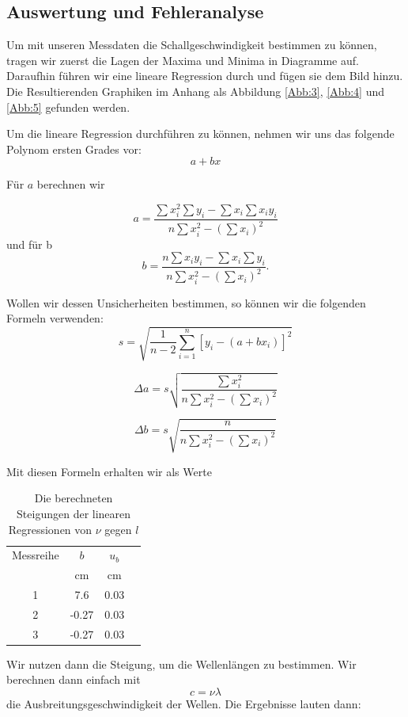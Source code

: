 \documentclass[11pt,a4paper]{article}
\begin{document}
\subsection{Auswertung und Fehleranalyse}

Um mit unseren Messdaten die Schallgeschwindigkeit bestimmen zu k\"onnen, tragen wir zuerst die Lagen der Maxima und Minima in Diagramme auf. Daraufhin f\"uhren wir eine lineare Regression durch und f\"ugen sie dem Bild hinzu. Die Resultierenden Graphiken im Anhang als Abbildung \ref{Abb:3}, \ref{Abb:4} und \ref{Abb:5} gefunden werden.

Um die lineare Regression durchf\"uhren zu k\"onnen, nehmen wir uns das folgende Polynom ersten Grades vor:
\[ a+bx\]

F\"ur $a$ berechnen wir

\[a=\frac{\sum x_i^2\sum y_i-\sum x_i\sum x_iy_i}{n\sum x_i^2-(\sum x_i)^2}\]
und f\"ur b
\[b=\frac{n\sum x_iy_i-\sum x_i\sum y_i}{n\sum x_i^2-(\sum x_i)^2}.\]

Wollen wir dessen Unsicherheiten bestimmen, so k\"onnen wir die folgenden Formeln verwenden:
\[
s=\sqrt{\frac{1}{n-2}\sum^n_{i=1}[y_i-(a+bx_i)]^2}\]

\[\Delta a=s\sqrt{\frac{\sum x_i^2}{n\sum x_i^2-(\sum x_i)^2}}\]

\[\Delta b=s\sqrt{\frac{n}{n\sum x_i^2-(\sum x_i)^2}}\]

Mit diesen Formeln erhalten wir als Werte

\begin{table}[h]
	\centering
	\begin{tabular*}{0.50\textwidth}{@{\extracolsep{\fill}}cccc}
		\toprule
		Messreihe & $b$ & $u_b$ \\
		& cm & cm\\
		1 & 7.6 & 0.03\\
		2 & -0.27 & 0.03\\
		3 & -0.27 & 0.03\\
		\bottomrule
	\end{tabular*}
\caption{Die berechneten Steigungen der linearen Regressionen von $\nu$ gegen $l$}
\label{Table1}
\end{table}

Wir nutzen dann die Steigung, um die Wellenl\"angen zu bestimmen. Wir berechnen dann einfach mit
\begin{equation}
c=\nu\lambda
\end{equation}
die Ausbreitungsgeschwindigkeit der Wellen. Die Ergebnisse lauten dann:
\end{document}
